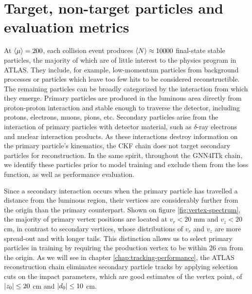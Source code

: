 \section{Target, non-target particles and evaluation metrics}
\label{sect:eval-metrics}
At $\expval{\mu}=200$, each collision event produces $\expval{N}\approx 10000$ final-state stable particles, the majority of which are of little interest to the physics program in ATLAS. 
They include, for example, low-momentum particles from background processes or particles which leave too few hits to be considered reconstructible.
The remaining particles can be broadly categorized by the interaction from which they emerge. 
Primary particles are produced in the luminous area directly from proton-proton interaction and stable enough to traverse the detector, including protons, electrons, muons, pions, etc.
Secondary particles arise from the interaction of primary particles with detector material, such as $\delta$-ray electrons and nuclear interaction products. 
As these interactions destroy information on the primary particle's kinematics, the CKF chain does not target secondary particles for reconstruction.
In the same spirit, throughout the GNN4ITk chain, we identify these particles prior to model training and exclude them from the loss function, as well as performance evaluation.

Since a secondary interaction occurs when the primary particle has travelled a distance from the luminous region, their vertices are considerably further from the origin than the primary counterpart. 
Shown on figure \ref{fig:vertex-spectrum}, the majority of primary vertex positions are located at $v_r < 20$ mm and $v_z < 20$ cm, in contrast to secondary vertices, whose distributions of $v_r$ and $v_z$ are more spread-out and with longer tails.
This distinction allows us to select primary particles in training by requiring the production vertex to be within 26 cm from the origin.
As we will see in chapter \ref{chap:tracking-performance}, the ATLAS reconstruction chain eliminates secondary particle tracks by applying selection cuts on the impact parameters, which are good estimates of the vertex point, of $\abs{z_0}\le 20$ cm and $\abs{d_0}\le10$ cm. 

